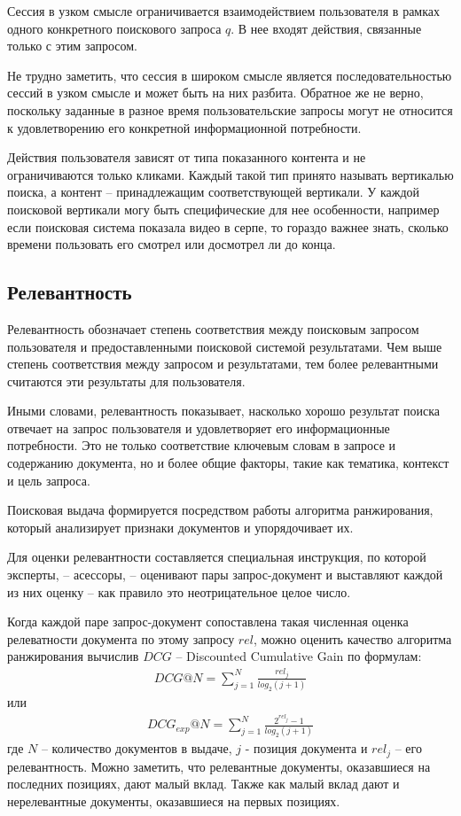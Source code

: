 \documentclass[diploma]{nanolab2015}
\begin{document}
Сессия в узком смысле ограничивается взаимодействием пользователя в рамках одного конкретного поискового запроса $q$. В нее входят действия, связанные только с этим запросом.

Не трудно заметить, что сессия в широком смысле является последовательностью сессий в узком смысле и может быть на них разбита. Обратное же не верно, поскольку заданные в разное время пользовательские запросы могут не относится к удовлетворению его конкретной информационной потребности.

Действия пользователя зависят от типа показанного контента и не ограничиваются только кликами. Каждый такой тип принято называть вертикалью поиска, а контент -- принадлежащим соответствующей вертикали. У каждой поисковой вертикали могу быть специфические для нее особенности, например если поисковая система показала видео в серпе, то гораздо важнее знать, сколько времени пользовать его смотрел или досмотрел ли до конца.

\subsection{Релевантность}
Релевантность обозначает степень соответствия между поисковым запросом пользователя и предоставленными поисковой системой результатами. Чем выше степень соответствия между запросом и результатами, тем более релевантными считаются эти результаты для пользователя.

Иными словами, релевантность показывает, насколько хорошо результат поиска отвечает на запрос пользователя и удовлетворяет его информационные потребности. Это не только соответствие ключевым словам в запросе и содержанию документа, но и более общие факторы, такие как тематика, контекст и цель запроса.

Поисковая выдача формируется посредством работы алгоритма ранжирования, который анализирует признаки документов и упорядочивает их.

Для оценки релевантности составляется специальная инструкция, по которой эксперты, -- асессоры, -- оценивают пары запрос-документ и выставляют каждой из них оценку -- как правило это неотрицательное целое число.

Когда каждой паре запрос-документ сопоставлена такая численная оценка релеватности документа по этому запросу $rel$, можно оценить качество алгоритма ранжирования вычислив $DCG$ -- Discounted Cumulative Gain по формулам:
\begin{align}
    DCG@N = \sum_{j=1}^{N} \frac{rel_j}{log_2(j+1)} \label{dcg}
\end{align}
или
\begin{align}
    DCG_{exp}@N = \sum_{j=1}^{N} \frac{2^{rel_j} - 1}{log_2(j+1)} \label{dcg:exp}
\end{align}
где $N$ -- количество документов в выдаче, $j$ - позиция документа и $rel_j$ -- его релевантность. Можно заметить, что релевантные документы, оказавшиеся на последних позициях, дают малый вклад. Также как малый вклад дают и нерелевантные документы, оказавшиеся на первых позициях.
\end{document}
